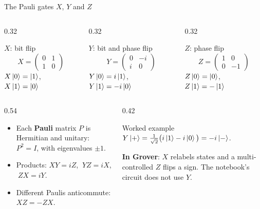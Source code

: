 \documentclass[aspectratio=169,11pt]{beamer}
\newcommand{\hl}[1]{{\color{qorange}\textbf{#1}}}
\newcommand{\key}[1]{{\color{qdark}\textbf{#1}}}
\begin{document}
\begin{frame}{The Pauli gates $X$, $Y$ and $Z$}
  \begin{columns}[T]
    \begin{column}{0.32\textwidth}
      \begin{block}{$X$: bit flip}
        \[ X = \begin{pmatrix}0&1\\1&0\end{pmatrix} \]
        $X\ket0 = \ket1$, $X\ket1 = \ket0$
      \end{block}
    \end{column}
    \begin{column}{0.32\textwidth}
      \begin{block}{$Y$: bit and phase flip}
        \[ Y = \begin{pmatrix}0&-i\\i&0\end{pmatrix} \]
        $Y\ket0 = i\ket1$, $Y\ket1 = -i\ket0$
      \end{block}
    \end{column}
    \begin{column}{0.32\textwidth}
      \begin{block}{$Z$: phase flip}
        \[ Z = \begin{pmatrix}1&0\\0&-1\end{pmatrix} \]
        $Z\ket0 = \ket0$, $Z\ket1 = -\ket1$
      \end{block}
    \end{column}
  \end{columns}
  \vspace{2mm}
  \begin{columns}[T]
    \begin{column}{0.54\textwidth}
      \begin{itemize}
        \item Each \key{Pauli} matrix $P$ is Hermitian and unitary: $P^2 = I$, with eigenvalues $\pm1$.
        \item Products: $XY = iZ$, $\ YZ = iX$, $\ ZX = iY$.
        \item Different Paulis anticommute: $XZ = -ZX$.
      \end{itemize}
    \end{column}
    \begin{column}{0.42\textwidth}
      \begin{exampleblock}{Worked example}
        $Y\ket{+} = \tfrac{1}{\sqrt2}\big(i\ket1 - i\ket0\big) = -i\ket{-}$.
      \end{exampleblock}
      \small \hl{In Grover}: $X$ relabels states and a multi-controlled $Z$ flips a sign. The notebook's circuit does not use $Y$.
    \end{column}
  \end{columns}
\end{frame}
\end{document}
